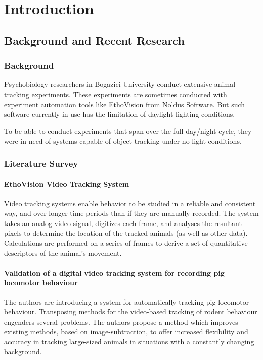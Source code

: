 \chapter{Introduction}

\section{Background and Recent Research}
\subsection{Background}
Psychobiology researchers in Bogazici University conduct extensive animal tracking experiments. These experiments are sometimes conducted with experiment automation tools like EthoVision from Noldus Software. But such software currently in use has the limitation of daylight lighting conditions.

To be able to conduct experiments that span over the full day/night cycle, they were in need of systems capable of object tracking under no light conditions.

\subsection{Literature Survey}

\subsubsection{EthoVision Video Tracking System \cite{Spink2001731}}
Video tracking systems enable behavior to be studied in a reliable and consistent way, and over longer time periods than if they are manually recorded. The system takes an analog video signal, digitizes each frame, and analyses the resultant pixels to determine the location of the tracked animals (as well as other data). Calculations are performed on a series of frames to derive a set of quantitative descriptors of the animal's movement. 
\subsubsection{Validation of a digital video tracking system for recording pig locomotor behaviour \cite{Lind2005123}}
The authors are introducing a system for automatically tracking pig locomotor behaviour. Transposing methods for the video-based tracking of rodent behaviour engenders several problems. The authors propose a method which improves existing methods, based on image-subtraction, to offer increased flexibility and accuracy in tracking large-sized animals in situations with a constantly changing background.
